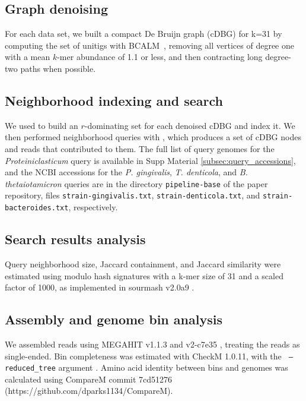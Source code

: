\subsection*{Graph denoising}

For each data set, we built a compact De Bruijn graph (cDBG) for
k=31 by computing the set of unitigs with
BCALM~\cite{chikhi2016compacting}, removing all vertices of degree one
with a mean $k$-mer abundance of 1.1 or less, and then contracting
long degree-two paths when possible.

\subsection*{Neighborhood indexing and search}

We used \sgc to build an $r$-dominating set for each denoised cDBG and
index it. We then performed neighborhood queries with \sgc, which
produces a set of cDBG nodes and reads that contributed to them.  The
full list of query genomes for the {\em Proteiniclasticum} query is
  available in Supp Material \ref{subsec:query_accessions}, and
  the NCBI accessions for the {\em P. gingivalis}, {\em T. denticola}, 
and {\em B. thetaiotamicron} queries are in the directory {\tt pipeline-base} 
of the paper repository, files {\tt strain-gingivalis.txt}, 
{\tt strain-denticola.txt}, and {\tt strain-bacteroides.txt}, respectively.

\subsection*{Search results analysis}

Query neighborhood size, Jaccard containment, and Jaccard similarity
were estimated using modulo hash signatures with a k-mer size of 31 and
a scaled factor of 1000, as implemented in sourmash v2.0a9
\cite{sourmash}.

\subsection*{Assembly and genome bin analysis}

We assembled reads using MEGAHIT v1.1.3 \cite{megahit} and \plass
v2-c7e35 \cite{plass}, treating the reads as single-ended. Bin
completeness was estimated with CheckM 1.0.11, with the {\tt
  --reduced\_tree} argument \cite{CheckM}.  Amino acid identity
between bins and genomes was calculated using CompareM commit
7cd51276 (https://github.com/dparks1134/CompareM).

